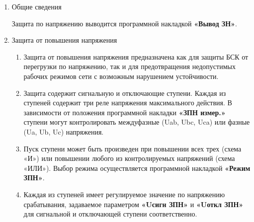 \color{black}

\begin{enumerate}[label=\arabic{section}.\arabic{subsection}.\arabic{enumi}, labelsep=4pt, leftmargin=0pt, itemindent=57pt, itemsep=0pt, parsep=0pt] %

\item Общие сведения
\begin{enumerate}[label=\arabic{section}.\arabic{subsection}.\arabic{enumi}.\arabic*, labelsep=4pt, leftmargin=0em, itemindent=65pt, parsep=0pt]

Защита по напряжению выводится программной накладкой \textbf{«Вывод ЗН»}. 


\end{enumerate}


\item Защита от повышения напряжения 
\begin{enumerate}[label=\arabic{section}.\arabic{subsection}.\arabic{enumi}.\arabic*, labelsep=4pt, leftmargin=0em, itemindent=65pt, parsep=0pt]


\item
Защита от повышения напряжения предназначена как для защиты БСК от перегрузки по 
напряжению, так и для предотвращения недопустимых рабочих режимов сети с возможным нарушением 
устойчивости. 

\item
Защита содержит сигнальную и отключающие ступени. Каждая из ступеней содержит три реле 
напряжения максимального действия. В зависимости от положения программной накладки 
\textbf{«ЗПН измер.»} ступени могут контролировать междуфазные (Uab, Ubc, Uca) или фазные (Ua, Ub, Uc) 
напряжения. 

\item
Пуск ступени может быть произведен при повышении всех трех (схема «И») или повышении 
любого из контролируемых напряжений (схема «ИЛИ»). Выбор режима осуществляется программной 
накладкой \textbf{«Режим ЗПН»}. 

\item
Каждая из ступеней имеет регулируемое значение по напряжению срабатывания, задаваемое 
параметром \textbf{«Uсигн ЗПН»} и \textbf{«Uоткл ЗПН»} для сигнальной и отключающей ступени соответственно. 


\end{enumerate}
\end{enumerate}
